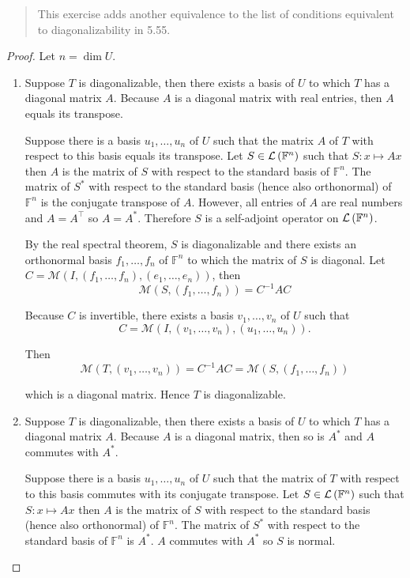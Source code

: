 \begin{quote}
    This exercise adds another equivalence to the list of conditions equivalent to diagonalizability in 5.55.
\end{quote}

\begin{proof}
    Let $n = \dim U$.

    \begin{enumerate}[label={(\alph*)}]
        \item Suppose $T$ is diagonalizable, then there exists a basis of $U$ to which $T$ has a diagonal matrix $A$. Because $A$ is a diagonal matrix with real entries, then $A$ equals its transpose.

              Suppose there is a basis $u_{1}, \ldots, u_{n}$ of $U$ such that the matrix $A$ of $T$ with respect to this basis equals its transpose. Let $S\in\mathcal{L}\left({\mathbb{F}^{n}}\right)$ such that $S: x\mapsto Ax$ then $A$ is the matrix of $S$ with respect to the standard basis of $\mathbb{F}^{n}$. The matrix of $S^{*}$ with respect to the standard basis (hence also orthonormal) of $\mathbb{F}^{n}$ is the conjugate transpose of $A$. However, all entries of $A$ are real numbers and $A = A^{\top}$ so $A = A^{*}$. Therefore $S$ is a self-adjoint operator on $\mathcal{L}\left({\mathbb{F}^{n}}\right)$.

              By the real spectral theorem, $S$ is diagonalizable and there exists an orthonormal basis $f_{1}, \ldots, f_{n}$ of $\mathbb{F}^{n}$ to which the matrix of $S$ is diagonal. Let $C = \mathcal{M}(I, (f_{1}, \ldots, f_{n}), (e_{1}, \ldots, e_{n}))$, then
              \[
                  \mathcal{M}(S, (f_{1},\ldots, f_{n})) = C^{-1}AC
              \]

              Because $C$ is invertible, there exists a basis $v_{1}, \ldots, v_{n}$ of $U$ such that
              \[
                  C = \mathcal{M}(I, (v_{1}, \ldots, v_{n}), (u_{1}, \ldots, u_{n})).
              \]

              Then
              \[
                  \mathcal{M}(T, (v_{1}, \ldots, v_{n})) = C^{-1}AC = \mathcal{M}(S, (f_{1},\ldots, f_{n}))
              \]

              which is a diagonal matrix. Hence $T$ is diagonalizable.
        \item Suppose $T$ is diagonalizable, then there exists a basis of $U$ to which $T$ has a diagonal matrix $A$. Because $A$ is a diagonal matrix, then so is $A^{*}$ and $A$ commutes with $A^{*}$.

              Suppose there is a basis $u_{1}, \ldots, u_{n}$ of $U$ such that the matrix of $T$ with respect to this basis commutes with its conjugate transpose. Let $S\in\mathcal{L}\left({\mathbb{F}^{n}}\right)$ such that $S: x\mapsto Ax$ then $A$ is the matrix of $S$ with respect to the standard basis (hence also orthonormal) of $\mathbb{F}^{n}$. The matrix of $S^{*}$ with respect to the standard basis of $\mathbb{F}^{n}$ is $A^{*}$. $A$ commutes with $A^{*}$ so $S$ is normal.


\end{enumerate}
\end{proof}
